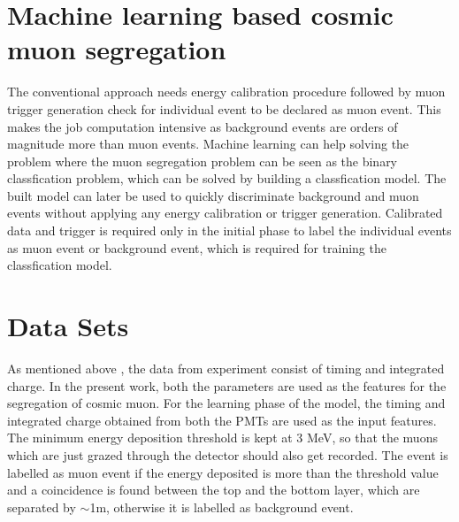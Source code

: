 \documentclass[twocolumn,amsmath,amssymb]{snp}
\begin{document}
\section*{Machine learning based cosmic muon segregation}
The conventional approach needs energy calibration procedure followed by muon trigger generation check for individual event to be declared as muon event. This makes the job computation intensive as background events are orders of magnitude more than muon events. Machine learning can help solving the problem where the muon segregation problem can be seen as the binary classfication problem, which can be solved by building a classfication model. The built model can later be used to quickly discriminate background and muon events without applying any energy calibration or trigger generation. Calibrated data and trigger is required only in the initial phase to label the individual events as muon event or background event, which is required for training the classfication model.

\section*{Data Sets}
As mentioned above%
, the data from experiment consist of timing and integrated charge.
In the present work, both the parameters are used as the features for the segregation of cosmic muon. For the learning phase of the model, the timing and integrated charge obtained from both the PMTs are used as the input features. The minimum energy deposition threshold is kept at 3 MeV, so that the muons which are just grazed through the detector should also get recorded. The event is labelled as muon event if the energy deposited is more than the threshold value and a coincidence is found between the
top and the bottom layer, which are separated by $\sim$1m, otherwise it is labelled as background event. 
\end{document}
